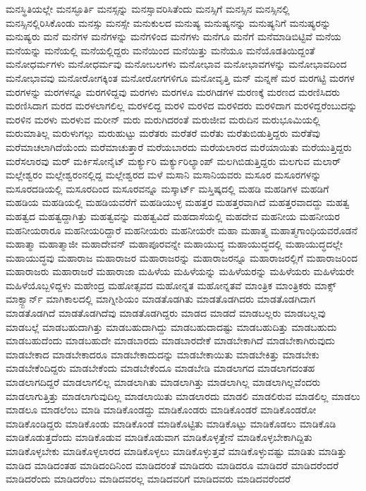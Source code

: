 {ಮನಸ್ಥಿತಿಯಲ್ಲೇ
ಮನಸ್ಫೂರ್ತಿ
ಮನಸ್ಸನ್ನು
ಮನಸ್ಸಾವರಿಸಿತೆಂದು
ಮನಸ್ಸಿಗೆ
ಮನಸ್ಸಿನ
ಮನಸ್ಸಿನಲ್ಲಿ
ಮನಸ್ಸಿನಲ್ಲಿರಿಸಿಕೊಂಡು
ಮನಸ್ಸು
ಮನಸ್ಸೇ
ಮನುಕುಲದ
ಮನುಷ್ಯ
ಮನುಷ್ಯನನ್ನು
ಮನುಷ್ಯನಿಗೆ
ಮನುಷ್ಯರನ್ನು
ಮನುಷ್ಯರು
ಮನೆ
ಮನೆಗಳ
ಮನೆಗಳನ್ನು
ಮನೆಗಳಿಂದ
ಮನೆಗಳು
ಮನೆಗೂ
ಮನೆಗೆ
ಮನೆಮಾಡಿಬಿಟ್ಟಿವೆ
ಮನೆಯ
ಮನೆಯನ್ನು
ಮನೆಯಲ್ಲಿ
ಮನೆಯಲ್ಲಿದ್ದರು
ಮನೆಯಿಂದ
ಮನೆಯಿತ್ತು
ಮನೆಯೂ
ಮನೆಯೊಡತಿಯಿದ್ದಂತೆ
ಮನೋಧರ್ಮಗಳು
ಮನೋಧರ್ಮವು
ಮನೋಬಲಗಳು
ಮನೋಭಾವ
ಮನೋಭಾವಗಳನ್ನು
ಮನೋಭಾವದಿಂದ
ಮನೋಭಾವವು
ಮನೋರೋಗಕ್ಕಿಂತ
ಮನೋರೋಗಗಳಿಗೂ
ಮನೋವೃತ್ತಿ
ಮನ್
ಮನ್ನಣೆ
ಮರ
ಮರಗಟ್ಟಿ
ಮರಗಳ
ಮರಗಳನ್ನು
ಮರಗಳನ್ನೂ
ಮರಗಳಿದ್ದವು
ಮರಗಳು
ಮರಗಳೂ
ಮರಗಿಡಗಳ
ಮರಣಕ್ಕೆ
ಮರಣದ
ಮರಣಿಸಿದರು
ಮರಣಿಸಿದಾಗ
ಮರದ
ಮರಳಲಾಗಲಿಲ್ಲ
ಮರಳಲಿದ್ದ
ಮರಳಿ
ಮರಳಿದ
ಮರಳಿದರು
ಮರಳಿದಾಗ
ಮರಳಿದ್ದರೆಂಬುದನ್ನು
ಮರಳಿನ
ಮರಳು
ಮರಳುವ
ಮರೀನ್
ಮರು
ಮರುಗಿದರಂತೆ
ಮರುಜೀವ
ಮರುದಿನ
ಮರುಭೂಮಿಯಲ್ಲಿ
ಮರುಮಾತಿಲ್ಲ
ಮರುಳುಗಲ್ಲು
ಮರುಹುಟ್ಟು
ಮರೆತರು
ಮರೆತರೆ
ಮರೆತು
ಮರೆತುಬಿಡುತ್ತಿದ್ದರು
ಮರೆತೆವು
ಮರೆಮಾಚಲಾಗಿದೆಯೆಂದು
ಮರೆಮಾಚುತ್ತಾರೆ
ಮರೆಯಬಾರದು
ಮರೆಯಲಾರದ
ಮರೆಯಾಯಿತು
ಮರೆಯುತ್ತಿದ್ದರು
ಮರೆಸಲಾರವು
ಮರ್
ಮರ್ಕಿಸೋನೈಟ್
ಮರ್ಕ್ಯುರಿ
ಮರ್ಕ್ಯುರಿಲ್ಯಾಂಪ್
ಮಲಗಿಬಿಡುತ್ತಿದ್ದರು
ಮಲಗುವ
ಮಲಾರ್
ಮಲ್ಲೇಶ್ವರಂ
ಮಲ್ಲೇಶ್ವರಂನಲ್ಲಿದ್ದ
ಮಲ್ಲೇಶ್ವರದ
ಮಳೆ
ಮಸಾನಿ
ಮಸಾನಿಯವರು
ಮಸೂರ
ಮಸೂರಗಳನ್ನು
ಮಸೂರದಡಿಯಲ್ಲಿ
ಮಸೂರದಿಂದ
ಮಸೂರವನ್ನೂ
ಮಸ್ಕಾರ್ಟ್
ಮಸ್ತಿಷ್ಕದಲ್ಲಿ
ಮಹಡಿ
ಮಹಡಿಗಳ
ಮಹಡಿಗೆ
ಮಹಡಿಯ
ಮಹಡಿಯಲ್ಲಿ
ಮಹಡಿಯವರೆಗೆ
ಮಹಡಿಯುಳ್ಳ
ಮಹತ್ತರ
ಮಹತ್ತರವಾಗಿದೆ
ಮಹತ್ತರವಾದದ್ದು
ಮಹತ್ವ
ಮಹತ್ವದ
ಮಹತ್ವದ್ದಾಗಿತ್ತು
ಮಹತ್ವವನ್ನು
ಮಹತ್ವವಿದೆ
ಮಹದಾಸೆಯಲ್ಲಿ
ಮಹದೇವ
ಮಹನೀಯ
ಮಹನೀಯರ
ಮಹನೀಯರಾರೂ
ಮಹನೀಯರಿದ್ದಾರೆ
ಮಹನೀಯರು
ಮಹನೀಯರೇ
ಮಹಾ
ಮಹಾತ್ಮ
ಮಹಾತ್ಮಗಾಂಧಿಯವರೊಡನೆ
ಮಹಾತ್ಮಾ
ಮಹಾತ್ಮಾಜೀ
ಮಹಾದೇವನ್
ಮಹಾಪೂರವನ್ನೇ
ಮಹಾಯುದ್ಧ
ಮಹಾಯುದ್ಧದಲ್ಲಿ
ಮಹಾಯುದ್ಧದಲ್ಲೇ
ಮಹಾಯುದ್ಧವು
ಮಹಾರಾಜ
ಮಹಾರಾಜರ
ಮಹಾರಾಜರನ್ನು
ಮಹಾರಾಜರನ್ನೂ
ಮಹಾರಾಜರಲ್ಲಿಗೆ
ಮಹಾರಾಜರಿಂದ
ಮಹಾರಾಜರು
ಮಹಾರಾಜರೆ
ಮಹಾರಾಜಾ
ಮಹಿಳೆಯ
ಮಹಿಳೆಯನ್ನು
ಮಹಿಳೆಯರನ್ನು
ಮಹಿಳೆಯರು
ಮಹಿಳೆಯರೇ
ಮಹಿಳೆಯೊಬ್ಬಳಿದ್ದಳು
ಮಹೇಂದ್ರ
ಮಹೋತ್ಸವದ
ಮಹೋನ್ನತ
ಮಹೋನ್ನತವೆ
ಮಾಂತ್ರಿಕ
ಮಾಂತ್ರಿಕರು
ಮಾಕ್ಸ್
ಮಾಕ್ಸ್ಬಾರ್ನ್
ಮಾಗಿಕಾಲದಲ್ಲಿ
ಮಾಗ್ನೀಶಿಯಂ
ಮಾಡತೊಡಗಿತು
ಮಾಡತೊಡಗಿದರು
ಮಾಡತೊಡಗಿದಾಗ
ಮಾಡತೊಡಗಿದೆ
ಮಾಡತೊಡಗಿದೆವು
ಮಾಡತೊಡಗಿದ್ದರು
ಮಾಡದ
ಮಾಡದೆ
ಮಾಡಬಲ್ಲರು
ಮಾಡಬಲ್ಲವು
ಮಾಡಬಲ್ಲೆ
ಮಾಡಬಹುದಾಗಿತ್ತು
ಮಾಡಬಹುದಾಗಿದ್ದು
ಮಾಡಬಹುದಾದಷ್ಟು
ಮಾಡಬಹುದಿತ್ತು
ಮಾಡಬಹುದು
ಮಾಡಬಹುದೆಂದು
ಮಾಡಬಹುದೇ
ಮಾಡಬಾರದು
ಮಾಡಬಾರದೇಕೆ
ಮಾಡಬೇಕಾಗಿದೆ
ಮಾಡಬೇಕಾಗಿರುವುದು
ಮಾಡಬೇಕಾದ
ಮಾಡಬೇಕಾದರೂ
ಮಾಡಬೇಕಾದುದನ್ನು
ಮಾಡಬೇಕಾಯಿತು
ಮಾಡಬೇಕಿತ್ತು
ಮಾಡಬೇಕು
ಮಾಡಬೇಕೆಂದಿದ್ದರು
ಮಾಡಬೇಕೆಂದು
ಮಾಡಬೇಕೆಂದೂ
ಮಾಡಬೇಡಿ
ಮಾಡಲಾಗದ
ಮಾಡಲಾಗದಂತಹ
ಮಾಡಲಾಗದಿದ್ದರೆ
ಮಾಡಲಾಗಲಿಲ್ಲ
ಮಾಡಲಾಗಿತು
ಮಾಡಲಾಗಿತ್ತು
ಮಾಡಲಾಗಿಲ್ಲ
ಮಾಡಲಾಗಿಲ್ಲವೆಂದರು
ಮಾಡಲಾಗುತ್ತಿತ್ತು
ಮಾಡಲಾಗುವುದಿಲ್ಲ
ಮಾಡಲಾಯಿತು
ಮಾಡಲಾರದು
ಮಾಡಲಿ
ಮಾಡಲಿರುವ
ಮಾಡಲಿಲ್ಲ
ಮಾಡಲು
ಮಾಡಲೂ
ಮಾಡಲೆಂಬ
ಮಾಡಿ
ಮಾಡಿಕೊಂಡದ್ದು
ಮಾಡಿಕೊಂಡರು
ಮಾಡಿಕೊಂಡರೆ
ಮಾಡಿಕೊಂಡರೋ
ಮಾಡಿಕೊಂಡಿದ್ದರು
ಮಾಡಿಕೊಂಡು
ಮಾಡಿಕೊಂಡೆ
ಮಾಡಿಕೊಟ್ಟಿತು
ಮಾಡಿಕೊಟ್ಟು
ಮಾಡಿಕೊಡಲು
ಮಾಡಿಕೊಡಿ
ಮಾಡಿಕೊಡುತ್ತದೆಂದು
ಮಾಡಿಕೊಡುವ
ಮಾಡಿಕೊಡುವಾಗ
ಮಾಡಿಕೊಳ್ಳತ್ತೇನೆ
ಮಾಡಿಕೊಳ್ಳಬೇಕಾಗಿದ್ದಿತು
ಮಾಡಿಕೊಳ್ಳಬೇಕು
ಮಾಡಿಕೊಳ್ಳಲಾರದ
ಮಾಡಿಕೊಳ್ಳಲು
ಮಾಡಿಕೊಳ್ಳುತ್ತವೆ
ಮಾಡಿಕೊಳ್ಳುವಷ್ಟು
ಮಾಡಿತು
ಮಾಡಿತ್ತು
ಮಾಡಿದ
ಮಾಡಿದಂತಹ
ಮಾಡಿದಂದಿನಿಂದ
ಮಾಡಿದರಂತೆ
ಮಾಡಿದರು
ಮಾಡಿದರೂ
ಮಾಡಿದರೆ
ಮಾಡಿದರೆಂದರೆ
ಮಾಡಿದರೆಂದು
ಮಾಡಿದರೆಂಬ
ಮಾಡಿದವರಲ್ಲ
ಮಾಡಿದವರಿಗೆ
ಮಾಡಿದವರು
ಮಾಡಿದವರೆಂದರೆ
}
